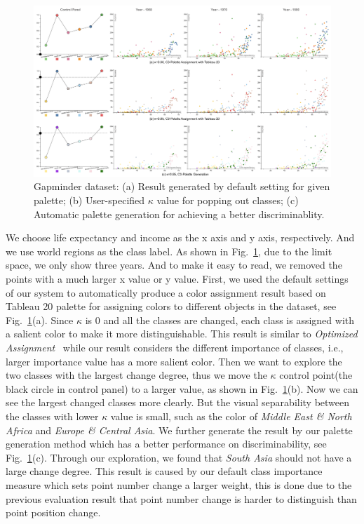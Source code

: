 \documentclass[review,onecolumn]{vgtc}                %
\begin{document}
\begin{figure}[h]
\centering
\includegraphics[width=\linewidth]{case-study.pdf}
\caption{Gapminder dataset: (a) Result generated by default setting for given palette; (b) User-specified $\kappa$ value for popping out classes; (c) Automatic palette generation for achieving a better discriminablity.}
\label{fig:casestudy}
\vspace{-3mm}
\end{figure}
We choose life expectancy and income as the x axis and y axis, respectively. And we use world regions as the class label. As shown in Fig.~\ref{fig:casestudy}, due to the limit space, we only show three years. And to make it easy to read, we removed the points with a much larger x value or y value.
First, we used the default settings of our system to automatically produce a color assignment result based on Tableau 20 palette for assigning colors to different objects in the dataset, see Fig.~\ref{fig:casestudy}(a). Since $\kappa$ is $0$ and all the classes are changed, each class is assigned with a salient color to make it more distinguishable. This result is similar to \emph{Optimized Assignment}~\cite{Wang2018} while our result considers the different importance of classes, i.e., larger importance value has a more salient color.
Then we want to explore the two classes with the largest change degree, thus we move the $\kappa$ control point(the black circle in control panel) to a larger value, as shown in Fig.~\ref{fig:casestudy}(b). Now we can see the largest changed classes more clearly. But the visual separability between the classes with lower $\kappa$ value is small, such as the color of \emph{Middle East \& North Africa} and \emph{Europe \& Central Asia}. We further generate the result by our palette generation method which has a better performance on discriminability, see Fig.~\ref{fig:casestudy}(c).
Through our exploration, we found that \emph{South Asia} should not have a large change degree. This result is caused by our default class importance measure which sets point number change a larger weight, this is done due to the previous evaluation result that point number change is harder to distinguish than point position change.
\end{document}
